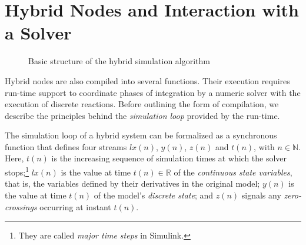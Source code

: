 \documentclass[11pt,titlepage,twoside]{report}
\newcommand{\lx}{\ensuremath{\mathit{lx}}}
\newcommand{\simulink}{{\sf Simulink}}
\newcommand{\bR}{\mathbb{R}}
\newcommand{\bN}{\mathbb{N}}
\begin{document}
\section{Hybrid Nodes and Interaction with a Solver\label{hybridnodes}} %

\begin{figure}[t]
\centering%
\caption{Basic structure of the hybrid simulation 
algorithm\label{fig:simalgo}}
\end{figure}

Hybrid nodes are also compiled into several functions.
Their execution requires run-time support to coordinate phases of
integration by a numeric solver with the execution of discrete reactions.
Before outlining the form of compilation, we describe the principles behind 
the \emph{simulation loop} provided by the run-time.

The simulation loop of a hybrid system can be formalized as a synchronous 
function that defines four streams $\lx(n)$, $y(n)$, $z(n)$ and $t(n)$, with 
$n \in \bN$.
Here, $t(n)$ is the increasing sequence of simulation times at which the 
solver stops;\footnote{They are called \emph{major time steps} in 
\simulink.} $\lx(n)$ is the value at time $t(n) \in \bR$ of the 
\emph{continuous state variables}, that is, the variables defined by their 
derivatives in the original model; $y(n)$ is the value at time $t(n)$ of the 
model's \emph{discrete state}; and $z(n)$ signals any \emph{zero-crossings} 
occurring at instant $t(n)$.
\end{document}
